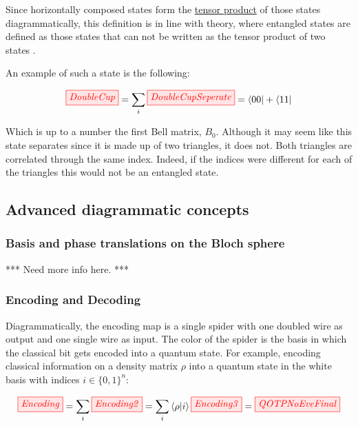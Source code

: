 \documentclass[]{article}
\begin{document}
Since horizontally composed states form the \hyperref[doubling]{tensor product} of those states diagrammatically, this definition is in line with theory, where entangled states are defined as those states that can not be written as the tensor product of two states \cite{nielsen2011}. 

An example of such a state is the following:

\begin{equation}
\tikzfig{DoubleCup} = \sum\limits_{i} \tikzfig{DoubleCupSeperate} = \bra{00} + \bra{11}
\end{equation}

Which is up to a number the first Bell matrix, $B_0$. Although it may seem like this state separates since it is made up of two triangles, it does not. Both triangles are correlated through the same index. Indeed, if the indices were different for each of the triangles this would not be an entangled state.

\subsection{Advanced diagrammatic concepts}

\subsubsection{Basis and phase translations on the Bloch sphere}
\label{basisandphasetranslations}

*** Need more info here. ***

\subsubsection{Encoding and Decoding}
\label{encodingdecoding}

Diagrammatically, the encoding map is a single spider with one doubled wire as output and one single wire as input. The color of the spider is the basis in which the classical bit gets encoded into a quantum state. For example, encoding classical information on a density matrix $\rho$ into a quantum state in the white basis with indices $i \in \{0,1\}^n$:

\begin{equation}
	\label{equation:Encoding}
	\tikzfig{Encoding} = \sum\limits_{i} \tikzfig{Encoding2} = \sum\limits_{i} \bra{\rho}\ket{i} \tikzfig{Encoding3} = \tikzfig{QOTPNoEveFinal}
\end{equation}
\end{document}
